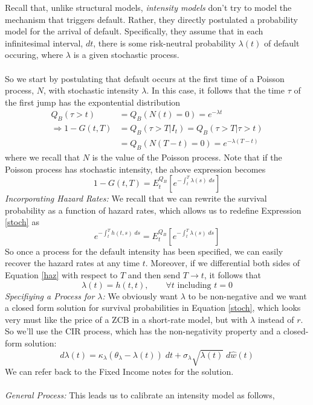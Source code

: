 \documentclass[a4paper,12pt]{scrartcl}
\begin{document}
Recall that, unlike structural models, \emph{intensity models} don't
try to model the mechanism that triggers default. Rather, they
directly postulated a probability model for the arrival of default.
Specifically, they assume that in each infinitesimal interval, $dt$,
there is some risk-neutral probability $\lambda(t)$ of default
occuring, where $\lambda$ is a given stochastic process.
\\
\\
So we start by postulating that default occurs at the first time of 
a Poisson process, $N$, with stochastic intensity $\lambda$. In this
case, it follows that the time $\tau$ of the first jump has the
expontential distribution
\begin{align*}
   Q_B(\tau > t) &= Q_B(N(t) =0) = e^{-\lambda t} \\
   \Rightarrow 1- G(t,T) &= Q_B(\tau > T | I_t) 
   = Q_B(\tau > T | \tau > t) \\
   &= Q_B(N(T-t) = 0) = e^{-\lambda (T-t)}
\end{align*}
where we recall that $N$ is the value of the Poisson process. Note
that if the Poisson process has stochastic intensity, the above
expression becomes
\begin{equation}
   \label{stoch}
   1-G(t,T)=E_t^{Q_B}\left[ e^{-\int^T_t \lambda(s) \; ds } \right]
\end{equation} 
{\sl Incorporating Hazard Rates:} We recall that we can rewrite
the survival probability as a function of hazard rates, which
allows us to redefine Expression \ref{stoch} as
\begin{equation}
   \label{haz}
   e^{-\int^T_t h(t,s) \; ds} = E_t^{Q_B}\left[
      e^{-\int^T_t \lambda(s) \; ds } \right]
\end{equation}
So once a process for the default intensity has been specified, 
we can easily recover the hazard rates at any time $t$. Moreover,
if we differential both sides of Equation \ref{haz} with respect to 
$T$ and then send $T\rightarrow t$, it follows that 
   \[ \lambda(t) = h(t,t), \qquad \forall t \text{ including $t=0$}\]
{\sl Specifiying a Process for $\lambda$:} We obviously want
$\lambda$ to be non-negative and we want a closed form solution for
survival probabilities in Equation \ref{stoch}, which looks very 
must like the price of a ZCB in a short-rate model, but
with $\lambda$ instead of $r$. So we'll use the CIR process, which
has the non-negativity property and a closed-form solution:
\begin{equation}
   \label{cir}
   d\lambda(t) = \kappa_\lambda(\theta_\lambda - \lambda(t)) \; dt
      + \sigma_\lambda \sqrt{\lambda(t)} \; d\hat{w}(t)
\end{equation}
We can refer back to the Fixed Income notes for the solution.
\\
\\
{\sl General Process:} This leads us to calibrate an intensity model
as follows,
\end{document}
